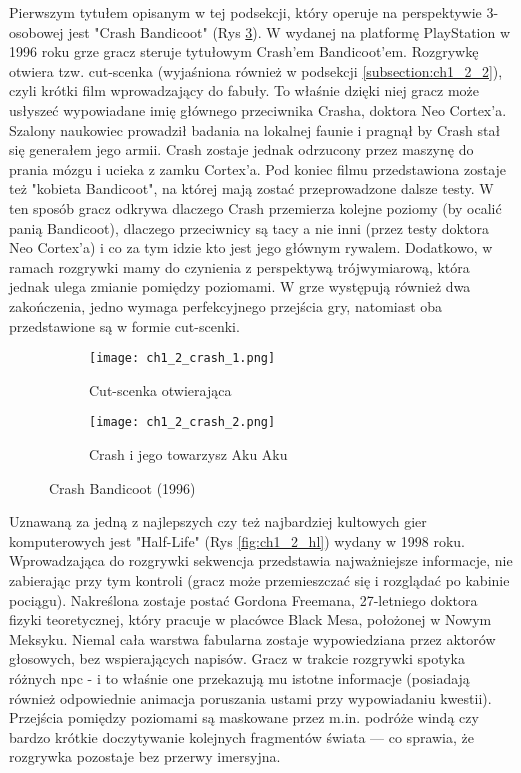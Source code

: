 Pierwszym tytułem opisanym w tej podsekcji, który operuje na perspektywie 3-osobowej jest
"Crash Bandicoot" (Rys \ref{fig:ch1_2_crash}). W wydanej na platformę PlayStation w 1996 roku grze
gracz steruje tytułowym Crash'em Bandicoot'em. Rozgrywkę otwiera tzw. cut-scenka (wyjaśniona również w
podsekcji \ref{subsection:ch1_2_2}), czyli krótki film wprowadzający do fabuły. To właśnie dzięki niej
gracz może usłyszeć wypowiadane imię głównego przeciwnika Crasha, doktora Neo Cortex'a.
Szalony naukowiec prowadził badania na lokalnej faunie i pragnął by Crash
stał się generałem jego armii. Crash zostaje jednak odrzucony przez maszynę do prania mózgu i ucieka
z zamku Cortex'a. Pod koniec filmu przedstawiona zostaje też "kobieta Bandicoot", na której mają zostać
przeprowadzone dalsze testy. W ten sposób gracz odkrywa dlaczego Crash przemierza kolejne poziomy (by ocalić
panią Bandicoot), dlaczego przeciwnicy są tacy a nie inni (przez testy doktora Neo Cortex'a) i co za tym
idzie kto jest jego głównym rywalem. Dodatkowo, w ramach rozgrywki mamy do czynienia z perspektywą
trójwymiarową, która jednak ulega zmianie pomiędzy poziomami. W grze występują również dwa zakończenia,
jedno wymaga perfekcyjnego przejścia gry, natomiast oba przedstawione są w formie cut-scenki.

\begin{figure}[h]
	\begin{subfigure}{0.49\textwidth}
		\caption{Cut-scenka otwierająca}
		\texttt{[image: ch1\_2\_crash\_1.png]}
		\label{subfig:ch_1_2_crash_1}
	\end{subfigure}
	\begin{subfigure}{0.49\textwidth}
		\caption{Crash i jego towarzysz Aku Aku}
		\texttt{[image: ch1\_2\_crash\_2.png]}
		\label{subfig:ch_1_2_crash_2}
	\end{subfigure}
	\caption{Crash Bandicoot (1996)}
	\label{fig:ch1_2_crash}
\end{figure}

Uznawaną za jedną z najlepszych czy też najbardziej kultowych gier komputerowych jest
"Half-Life" (Rys \ref{fig:ch1_2_hl}) wydany w 1998 roku.
Wprowadzająca do rozgrywki sekwencja przedstawia najważniejsze informacje, nie zabierając
przy tym kontroli (gracz może przemieszczać się i rozglądać po kabinie pociągu). Nakreślona zostaje
postać Gordona Freemana, 27-letniego doktora fizyki teoretycznej, który pracuje w placówce Black Mesa,
położonej w Nowym Meksyku. Niemal cała warstwa fabularna zostaje wypowiedziana przez aktorów głosowych,
bez wspierających napisów. Gracz w trakcie rozgrywki spotyka różnych \gls{npc} - i to właśnie one
przekazują mu istotne informacje (posiadają również odpowiednie animacja poruszania ustami przy
wypowiadaniu kwestii). Przejścia pomiędzy poziomami są maskowane przez m.in. podróże windą czy
bardzo krótkie doczytywanie kolejnych fragmentów świata --- co sprawia, że rozgrywka pozostaje
bez przerwy imersyjna.

